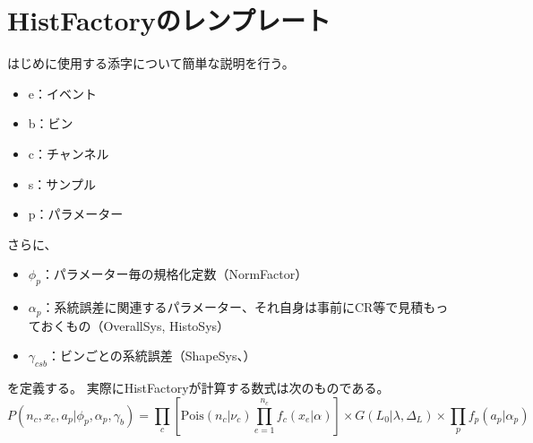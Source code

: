 \section{HistFactoryのレンプレート}
はじめに使用する添字について簡単な説明を行う。
\begin{itemize}
  \item e：イベント
  \item b：ビン
  \item c：チャンネル
  \item s：サンプル
  \item p：パラメーター
\end{itemize}

さらに、
\begin{itemize}
  \item ${\phi_p}$：パラメーター毎の規格化定数（NormFactor）
  \item ${\alpha_p}$：系統誤差に関連するパラメーター、それ自身は事前にCR等で見積もっておくもの（OverallSys, HistoSys）
  \item ${\gamma_{csb}}$：ビンごとの系統誤差（ShapeSys、）
\end{itemize}
を定義する。 実際にHistFactoryが計算する数式は次のものである。
\begin{equation}
  P(n_c,x_e,a_p|\phi_p,\alpha_p,\gamma_b) = \prod_{c}\left[\mathrm{Pois}(n_c|\nu_c) \prod_{e=1}^{n_c}f_c(x_e|\alpha) \right]
  \times G(L_0|\lambda,\Delta_L)
  \times \prod_{p} f_p(a_p|\alpha_p)
\end{equation}

